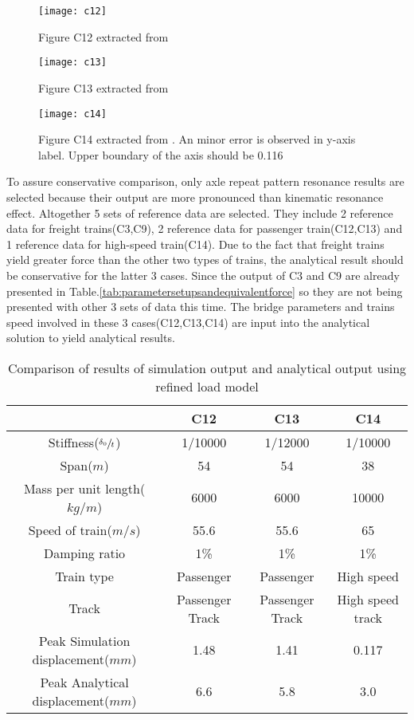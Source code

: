 \begin{figure}[h!]
    \centering
    \texttt{[image: c12]}
    \caption{Figure C12 extracted from \cite{d181dt329} }
    \label{fig:c12}
\end{figure}

\begin{figure}[h!]
    \centering
    \texttt{[image: c13]}
    \caption{Figure C13 extracted from \cite{d181dt329} }
    \label{fig:c13}
\end{figure}

\begin{figure}[h!]
    \centering
    \texttt{[image: c14]}
    \caption{Figure C14 extracted from \cite{d181dt329}. An minor error is observed in y-axis label. Upper boundary of the axis should be 0.116 }
    \label{fig:c14}
\end{figure}

To assure conservative comparison, only axle repeat pattern resonance results are selected because their output are more pronounced than kinematic resonance effect. Altogether 5 sets of reference data are selected. They include 2 reference data for freight trains(C3,C9), 2 reference data for passenger train(C12,C13) and 1 reference data for high-speed train(C14). Due to the fact that freight trains yield greater force than the other two types of trains, the analytical result should be conservative for the latter 3 cases. Since the output of C3 and C9 are already presented in Table.\ref{tab:parametersetupsandequivalentforce} so they are not being presented with other 3 sets of data this time. The bridge parameters and trains speed involved in these 3 cases(C12,C13,C14) are input into the analytical solution to yield analytical results.

\begin{table}[h!]
    \centering
    \caption{Comparison of results of simulation output and analytical output using refined load model}
    \begin{tabular}{c|ccc}
        \hline
         & C12 & C13 & C14\\
        \hline
        Stiffness($\sfrac{\delta_0}{t}$) & 1/10000 & 1/12000 & 1/10000\\
        Span($m$) & 54 & 54 & 38\\
        Mass per unit length($kg/m$) & 6000 & 6000 & 10000\\
        Speed of train($m/s$) & 55.6 & 55.6 & 65\\
        Damping ratio & 1\% & 1\% & 1\%\\
        Train type & Passenger & Passenger & High speed \\
        Track & Passenger Track & Passenger Track & High speed track\\
        \hline
        Peak Simulation displacement($mm$) & 1.48 & 1.41 & 0.117\\
        Peak Analytical displacement($mm$) & 6.6 & 5.8 & 3.0 \\
        \hline
    \end{tabular}
    \label{tab:comparisonresultssimulationanalytical}
\end{table}


